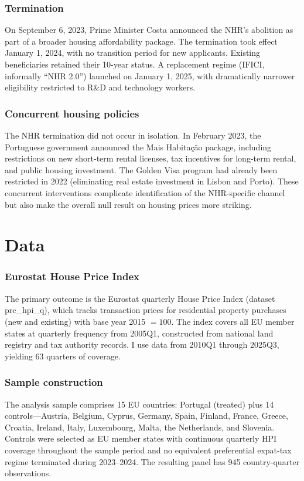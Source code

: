 \documentclass[12pt]{article}
\begin{document}
\subsubsection*{Termination} On September 6, 2023, Prime Minister Costa announced the NHR's abolition as part of a broader housing affordability package. The termination took effect January 1, 2024, with no transition period for new applicants. Existing beneficiaries retained their 10-year status. A replacement regime (IFICI, informally ``NHR 2.0'') launched on January 1, 2025, with dramatically narrower eligibility restricted to R\&D and technology workers.

\subsubsection*{Concurrent housing policies} The NHR termination did not occur in isolation. In February 2023, the Portuguese government announced the Mais Habita\c{c}\~{a}o package, including restrictions on new short-term rental licenses, tax incentives for long-term rental, and public housing investment. The Golden Visa program had already been restricted in 2022 (eliminating real estate investment in Lisbon and Porto). These concurrent interventions complicate identification of the NHR-specific channel but also make the overall null result on housing prices more striking.


\section{Data}

\subsubsection*{Eurostat House Price Index} The primary outcome is the Eurostat quarterly House Price Index (dataset prc\_hpi\_q), which tracks transaction prices for residential property purchases (new and existing) with base year 2015 $= 100$. The index covers all EU member states at quarterly frequency from 2005Q1, constructed from national land registry and tax authority records. I use data from 2010Q1 through 2025Q3, yielding 63 quarters of coverage.

\subsubsection*{Sample construction} The analysis sample comprises 15 EU countries: Portugal (treated) plus 14 controls---Austria, Belgium, Cyprus, Germany, Spain, Finland, France, Greece, Croatia, Ireland, Italy, Luxembourg, Malta, the Netherlands, and Slovenia. Controls were selected as EU member states with continuous quarterly HPI coverage throughout the sample period and no equivalent preferential expat-tax regime terminated during 2023--2024. The resulting panel has 945 country-quarter observations.
\end{document}
